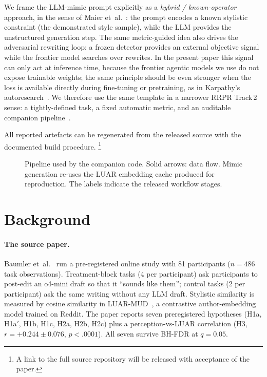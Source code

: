 \documentclass[runningheads]{llncs}
\providecommand{\ifanonymous}{}  %
\newif\ifanonymous \anonymoustrue
\begin{document}
We frame the LLM-mimic prompt explicitly as a \emph{hybrid /
known-operator} approach, in the sense of
Maier et~al.~\cite{maier2018precision,maier2022knownoperator}: the
prompt encodes a known stylistic constraint (the demonstrated style
sample), while the LLM provides the unstructured generation step.
The same metric-guided idea also drives the adversarial rewriting
loop: a frozen detector provides an external objective signal while
the frontier model searches over rewrites. In the present paper this
signal can only act at inference time, because the frontier agentic
models we use do not expose trainable weights; the same principle
should be even stronger when the loss is available directly during
fine-tuning or pretraining, as in
Karpathy's autoresearch~\cite{karpathy2026autoresearch}. We therefore
use the same template in a narrower RRPR Track\,2 sense: a
tightly-defined task, a fixed automatic metric, and an auditable
companion pipeline~\cite{karpathy2026autoresearch,zaiss2026agent4mr}.

All reported artefacts can be regenerated from the released source
with the documented build procedure.\ifanonymous
\footnote{A link to the full source repository will be released with
acceptance of the paper.}\else
\footnote{Source repository:
\url{https://github.com/akmaier/personal_style_postedit}.}\fi

\begin{figure}[t]
\centering
\resizebox{\linewidth}{!}{}
\caption{Pipeline used by the companion code. Solid arrows: data flow.
Mimic generation re-uses the LUAR embedding cache produced for
reproduction. The labels indicate the released workflow stages.}
\label{fig:pipeline}
\end{figure}

\section{Background}\label{sec:background}

\paragraph{The source paper.}
Baumler et~al.~\cite{baumler2026personalstyle} run a pre-registered
online study with 81 participants ($n{=}486$ task observations).
Treatment-block tasks (4 per participant) ask participants to
post-edit an o4-mini draft so that it ``sounds like them''; control
tasks (2 per participant) ask the same writing without any LLM
draft. Stylistic similarity is measured by cosine similarity in
LUAR-MUD~\cite{rivera2021luar}, a contrastive author-embedding model
trained on Reddit. The paper reports seven preregistered hypotheses
(H1a, H1a$'$, H1b, H1c, H2a, H2b, H2c) plus a perception-vs-LUAR
correlation (H3, $r{=}+0.244\pm0.076$, $p<.0001$). All seven survive
BH-FDR at $q{=}0.05$.
\end{document}
